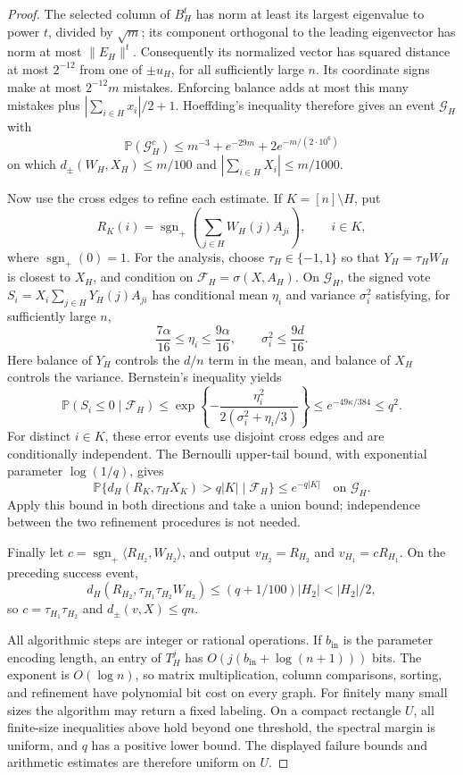 \documentclass[11pt]{article}
\def\P{\mathbb{P}}
\numberwithin{equation}{section}
\begin{document}
\begin{proof}
The selected column of $B_H^t$ has norm at least its largest eigenvalue to power $t$, divided by $\sqrt m$; its component orthogonal to the leading eigenvector has norm at most $\|E_H\|^t$. Consequently its normalized vector has squared distance at most $2^{-12}$ from one of $\pm u_H$, for all sufficiently large $n$. Its coordinate signs make at most $2^{-12}m$ mistakes. Enforcing balance adds at most this many mistakes plus $|\sum_{i\in H}x_i|/2+1$. Hoeffding's inequality \cite[Chapter~2]{BLM13} therefore gives an event $\mathcal G_H$ with
\[
 \P(\mathcal G_H^c)\le m^{-3}+e^{-29m}+2e^{-m/(2\cdot10^6)}
\]
on which $d_\pm(W_H,X_H)\le m/100$ and $|\sum_{i\in H}X_i|\le m/1000$.

Now use the cross edges to refine each estimate. If $K=[n]\setminus H$, put
\[
 R_K(i)=\operatorname{sgn}_+\!\left(\sum_{j\in H}W_H(j)A_{ji}\right),\qquad i\in K,
\]
where $\operatorname{sgn}_+(0)=1$. For the analysis, choose $\tau_H\in\{-1,1\}$ so that $Y_H=\tau_HW_H$ is closest to $X_H$, and condition on $\mathcal F_H=\sigma(X,A_H)$. On $\mathcal G_H$, the signed vote
$S_i=X_i\sum_{j\in H}Y_H(j)A_{ji}$ has conditional mean $\eta_i$ and variance $\sigma_i^2$ satisfying, for sufficiently large $n$,
\[
 \frac{7\alpha}{16}\le\eta_i\le\frac{9\alpha}{16},\qquad
 \sigma_i^2\le\frac{9d}{16}.
\]
Here balance of $Y_H$ controls the $d/n$ term in the mean, and balance of $X_H$ controls the variance. Bernstein's inequality \cite[Theorem~2.10 and Corollary~2.11]{BLM13} yields
\[
 \P(S_i\le0\mid\mathcal F_H)
 \le\exp\left\{-\frac{\eta_i^2}{2(\sigma_i^2+\eta_i/3)}\right\}
 \le e^{-49\kappa/384}\le q^2.
\]
For distinct $i\in K$, these error events use disjoint cross edges and are conditionally independent. The Bernoulli upper-tail bound, with exponential parameter $\log(1/q)$, gives
\[
 \P\{d_H(R_K,\tau_HX_K)>q|K|\mid\mathcal F_H\}
 \le e^{-q|K|}
 \quad\text{on }\mathcal G_H.
\]
Apply this bound in both directions and take a union bound; independence between the two refinement procedures is not needed.

Finally let $c=\operatorname{sgn}_+\langle R_{H_2},W_{H_2}\rangle$, and output
$v_{H_2}=R_{H_2}$ and $v_{H_1}=cR_{H_1}$. On the preceding success event,
\[
 d_H(R_{H_2},\tau_{H_1}\tau_{H_2}W_{H_2})
 \le(q+1/100)|H_2|<|H_2|/2,
\]
so $c=\tau_{H_1}\tau_{H_2}$ and $d_\pm(v,X)\le qn$.

All algorithmic steps are integer or rational operations. If $b_{\mathrm{in}}$ is the parameter encoding length, an entry of $T_H^j$ has $O(j(b_{\mathrm{in}}+\log(n+1)))$ bits. The exponent is $O(\log n)$, so matrix multiplication, column comparisons, sorting, and refinement have polynomial bit cost on every graph. For finitely many small sizes the algorithm may return a fixed labeling. On a compact rectangle $U$, all finite-size inequalities above hold beyond one threshold, the spectral margin is uniform, and $q$ has a positive lower bound. The displayed failure bounds and arithmetic estimates are therefore uniform on $U$.
\end{proof}
\end{document}
